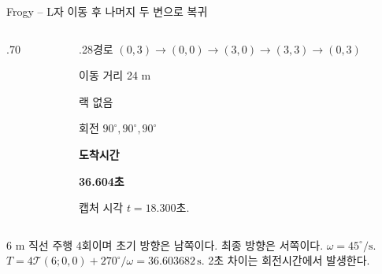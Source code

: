 \begin{frame}{Frogy -- L자 이동 후 나머지 두 변으로 복귀}
\begin{columns}[T,onlytextwidth]
\begin{column}{.70\textwidth}\end{column}
\begin{column}{.28\textwidth}\small 경로 $(0,3)\to(0,0)\to(3,0)\to(3,3)\to(0,3)$\par\medskip 이동 거리 24 m\par 랙 없음\par 회전 $90^\circ,90^\circ,90^\circ$\par\medskip\textbf{도착시간}\par\textbf{36.604초}\par\medskip 캡처 시각 $t=18.300$초.\end{column}
\end{columns}
\vspace{1mm}
{\tiny\texttt{}\par
\texttt{}\par
6 m 직선 주행 4회이며 초기 방향은 남쪽이다. 최종 방향은 서쪽이다. $\omega=45^\circ/\mathrm{s}$. $T=4\mathcal T(6;0,0)+270^\circ/\omega=36.603682\,\mathrm{s}$. 2초 차이는 회전시간에서 발생한다.}
\end{frame}

